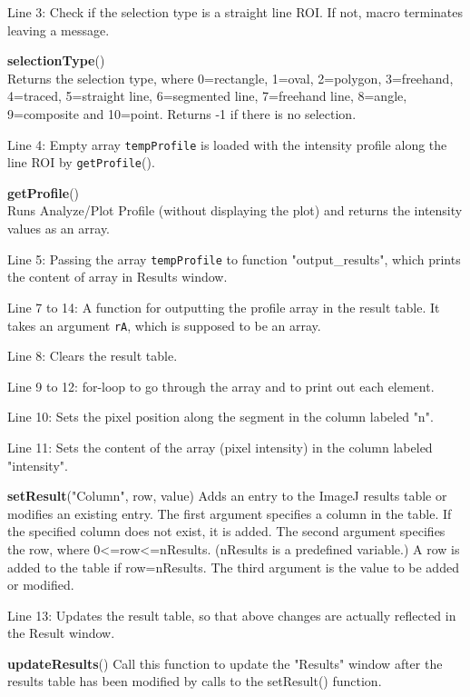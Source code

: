 \documentclass[11pt,a4paper,oneside]{report}
\newenvironment{indentCom}%
{\begin{list}{}%
         {\setlength{\leftmargin}{1em}}%
         \item[]%
}
{\end{list}}
\newcommand{\ilcom}[1]{\texttt{\small#1}}
\begin{document}
\begin{itemize}
\item Line 3: Check if the selection type is a straight line ROI. If not, macro terminates leaving a message. 

\begin{indentCom}
\textbf{selectionType}()\\ 
Returns the selection type, where 0=rectangle, 1=oval, 2=polygon, 3=freehand, 4=traced, 5=straight line, 6=segmented line, 7=freehand line, 8=angle, 9=composite and 10=point. Returns -1 if there is no selection.
\end{indentCom}

\item Line 4: Empty array \ilcom{tempProfile} is loaded with the intensity profile along the line ROI by \ilcom{getProfile}().
\item
\begin{indentCom}
\textbf{getProfile}()\\
Runs Analyze/Plot Profile (without displaying the plot) and returns the intensity values as an array.
\end{indentCom}

\item Line 5: Passing the array \ilcom{tempProfile} to function "output\_results", which prints the content of array in Results window. 

\item Line 7 to 14: A function for outputting the profile array in the result table. It takes an argument \ilcom{rA}, which is supposed to be an array. 
\item Line 8: Clears the result table. 
\item Line 9 to 12: for-loop to go through the array and to print out each element. 
\item Line 10: Sets the pixel position along the segment in the column labeled "n". 
\item Line 11: Sets the content of the array (pixel intensity) in the column labeled "intensity".

\begin{indentCom}
\textbf{setResult}("Column", row, value)
Adds an entry to the ImageJ results table or modifies an existing entry. The first argument specifies a column in the table. If the specified column does not exist, it is added. The second argument specifies the row, where 0<=row<=nResults. (nResults is a predefined variable.) A row is added to the table if row=nResults. The third argument is the value to be added or modified. 
\end{indentCom}
\item Line 13: Updates the result table, so that above changes are actually reflected in the Result window. 

\begin{indentCom}
\textbf{updateResults}()
Call this function to update the "Results" window after the results table has been modified by calls to the setResult() function. 
\end{indentCom}
\end{itemize}
\end{document}
